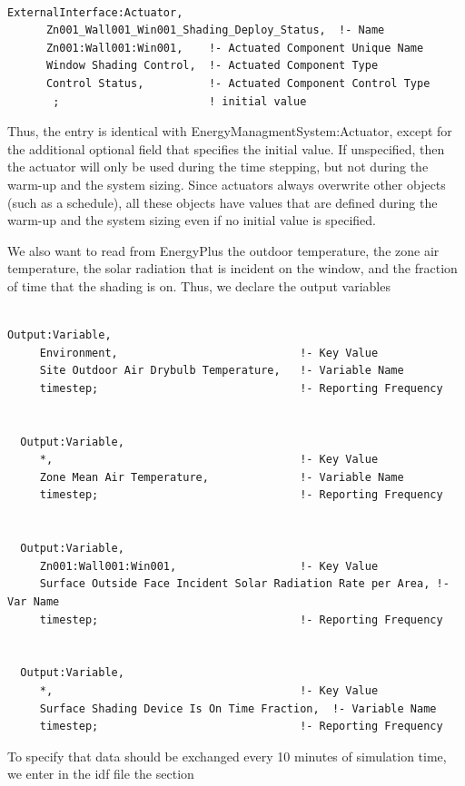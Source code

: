 \begin{lstlisting}

ExternalInterface:Actuator,
      Zn001_Wall001_Win001_Shading_Deploy_Status,  !- Name
      Zn001:Wall001:Win001,    !- Actuated Component Unique Name
      Window Shading Control,  !- Actuated Component Type
      Control Status,          !- Actuated Component Control Type
       ;                       ! initial value
\end{lstlisting}

Thus, the entry is identical with EnergyManagmentSystem:Actuator, except for the additional optional field that specifies the initial value. If unspecified, then the actuator will only be used during the time stepping, but not during the warm-up and the system sizing. Since actuators always overwrite other objects (such as a schedule), all these objects have values that are defined during the warm-up and the system sizing even if no initial value is specified.

We also want to read from EnergyPlus the outdoor temperature, the zone air temperature, the solar radiation that is incident on the window, and the fraction of time that the shading is on. Thus, we declare the output variables

\begin{lstlisting}

Output:Variable,
     Environment,                            !- Key Value
     Site Outdoor Air Drybulb Temperature,   !- Variable Name
     timestep;                               !- Reporting Frequency


  Output:Variable,
     *,                                      !- Key Value
     Zone Mean Air Temperature,              !- Variable Name
     timestep;                               !- Reporting Frequency


  Output:Variable,
     Zn001:Wall001:Win001,                   !- Key Value
     Surface Outside Face Incident Solar Radiation Rate per Area, !- Var Name
     timestep;                               !- Reporting Frequency


  Output:Variable,
     *,                                      !- Key Value
     Surface Shading Device Is On Time Fraction,  !- Variable Name
     timestep;                               !- Reporting Frequency
\end{lstlisting}

To specify that data should be exchanged every 10 minutes of simulation time, we enter in the idf file the section

